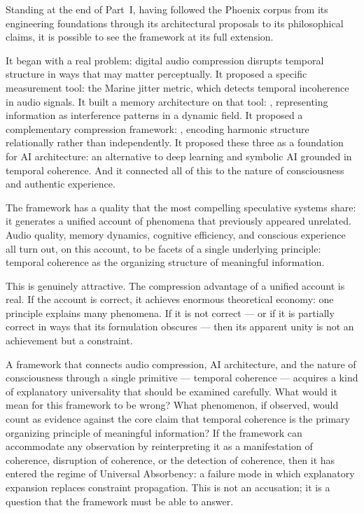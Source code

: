 Standing at the end of Part~I, having followed the Phoenix
corpus from its engineering foundations through its
architectural proposals to its philosophical claims, it is
possible to see the framework at its full extension.

It began with a real problem: digital audio compression
disrupts temporal structure in ways that may matter
perceptually. It proposed a specific measurement tool:
the Marine jitter metric, which detects temporal incoherence
in audio signals. It built a memory architecture on that
tool: \MEMeight{}, representing information as interference
patterns in a dynamic field. It proposed a complementary
compression framework: \HCFone{}, encoding harmonic structure
relationally rather than independently. It proposed these
three as a foundation for AI architecture: an alternative
to deep learning and symbolic AI grounded in temporal
coherence. And it connected all of this to the nature of
consciousness and authentic experience.

The framework has a quality that the most compelling
speculative systems share: it generates a unified account
of phenomena that previously appeared unrelated. Audio
quality, memory dynamics, cognitive efficiency, and conscious
experience all turn out, on this account, to be facets of
a single underlying principle: temporal coherence as the
organizing structure of meaningful information.

This is genuinely attractive. The compression advantage of
a unified account is real. If the account is correct, it
achieves enormous theoretical economy: one principle
explains many phenomena. If it is not correct --- or if
it is partially correct in ways that its formulation
obscures --- then its apparent unity is not an achievement
but a constraint.

\begin{dangerzone}
A framework that connects audio compression, AI architecture,
and the nature of consciousness through a single primitive
--- temporal coherence --- acquires a kind of explanatory
universality that should be examined carefully. What would
it mean for this framework to be wrong? What phenomenon,
if observed, would count as evidence against the core claim
that temporal coherence is the primary organizing principle
of meaningful information? If the framework can accommodate
any observation by reinterpreting it as a manifestation of
coherence, disruption of coherence, or the detection of
coherence, then it has entered the regime of Universal
Absorbency: a failure mode in which explanatory expansion
replaces constraint propagation. This is not an accusation;
it is a question that the framework must be able to answer.
\end{dangerzone}

